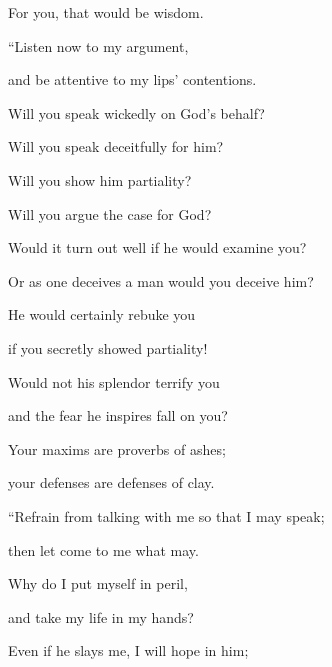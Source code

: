 {\par }{\Q For you, that would be
wisdom.
\par }{\Q {}“Listen
now
to my argument,
\par }{\Q and be attentive
to my lips’
contentions.
\par }{\Q {}Will you speak
wickedly on God’s
behalf?

\par }{\Q Will you speak
deceitfully for him?
\par }{\Q {}Will you
show him partiality?

\par }{\Q Will
you argue
the case for God?
\par }{\Q {}Would it
turn out
well
if
he would examine
you?
\par }{\Q Or as one deceives
a man
would you deceive him?
\par }{\Q {}He would certainly
rebuke
you
\par }{\Q if
you secretly
showed partiality!
\par }{\Q {}Would not
his
splendor terrify
you
\par }{\Q and the fear
he inspires
fall
on you?
\par }{\Q {}Your maxims
are proverbs
of ashes;
\par }{\Q your defenses
are defenses
of clay.
\par }{\Q {}“Refrain
from
talking
with me
so that I
may speak;
\par }{\Q then let
come to me what may.
\par }{\Q {}Why
do I put myself in peril,
\par }{\Q and take my life
in my hands?
\par }{\Q {}Even if
he slays
me, I will hope
in him;

}
